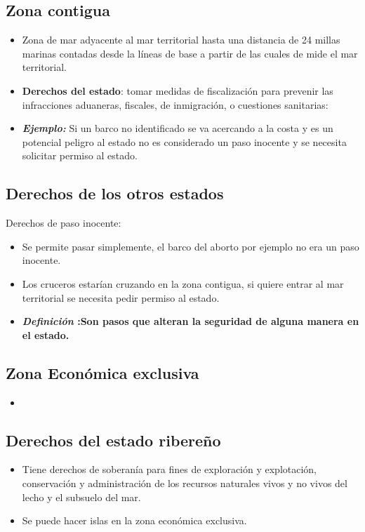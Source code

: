 \subsection{Zona contigua}
\begin{itemize}
    \item Zona de mar adyacente al mar territorial hasta una distancia de 24 millas marinas contadas desde la líneas de base a partir de las cuales de mide el mar territorial.
    \item \textbf{Derechos del estado}: tomar medidas de fiscalización para prevenir las infracciones aduaneras, fiscales, de inmigración, o cuestiones sanitarias:
    \item \textbf{\emph{Ejemplo:}} Si un barco no identificado se va acercando a la costa y es un potencial peligro al estado no es considerado un paso inocente y se necesita solicitar permiso al estado.
\end{itemize}

\subsection{Derechos de los otros estados}
Derechos de paso inocente:
\begin{itemize}
    \item Se permite pasar simplemente, el barco del aborto por ejemplo no era un paso inocente.
    \item Los cruceros estarían cruzando en la zona contigua, si quiere entrar al mar territorial se necesita pedir permiso al estado.
    \item \textbf{\emph{Definición} :Son pasos que alteran la seguridad de alguna manera en el estado.}
\end{itemize}

\subsection{Zona Económica exclusiva}
\begin{itemize}
    \item 
\end{itemize}

\subsection{Derechos del estado ribereño}
\begin{itemize}
    \item Tiene derechos de soberanía para fines de exploración y explotación, conservación y administración de los recursos naturales vivos y no vivos del lecho y el subsuelo del mar.
    \item Se puede hacer islas en la zona económica exclusiva.
\end{itemize}

